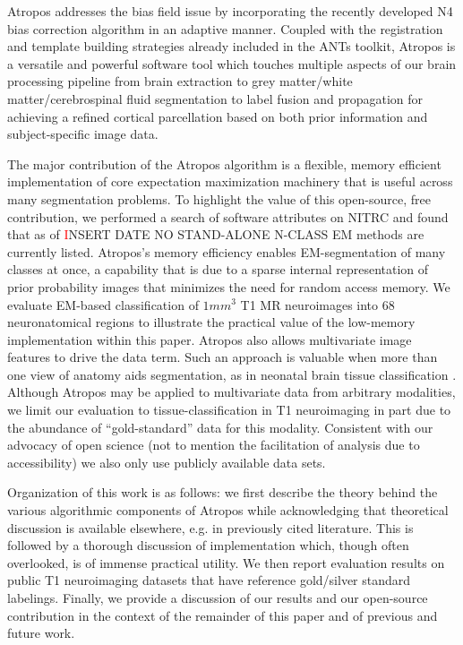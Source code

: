 \documentclass[11pt,english]{article}
\begin{document}
Atropos addresses the bias field issue by incorporating the recently developed N4 bias correction algorithm \citep{Tustison2010} in an adaptive manner.  Coupled with the registration \citep{Avants2010b} and template building strategies \citep{Avants2010} already included in the ANTs toolkit,   
Atropos is a versatile and powerful software tool which touches multiple aspects of our brain processing pipeline from brain extraction \citep{Avants2010a} to grey matter/white matter/cerebrospinal fluid segmentation to label fusion and propagation for achieving a refined cortical parcellation based on both prior information and subject-specific image data.  


The major contribution of the Atropos algorithm is a flexible, memory
efficient implementation of core expectation maximization machinery
that is useful across many segmentation problems.  To highlight the
value of this open-source, free contribution, we performed a search of
software attributes on NITRC and found that as of {\textcolor{red}
INSERT DATE NO STAND-ALONE N-CLASS EM methods are currently listed}.
Atropos's memory efficiency enables EM-segmentation of many classes at
once, a capability that is due to a sparse internal representation of
prior probability images that minimizes the need for random access
memory.  We evaluate EM-based classification of $1 mm^3$ T1 MR
neuroimages into 68 neuronatomical regions to illustrate the practical
value of the low-memory implementation within this paper.  Atropos
also allows multivariate image features to drive the data term.  Such
an approach is valuable when more than one view of anatomy aids
segmentation, as in neonatal brain tissue classification
\cite{Weisenfeld2009}.  Although Atropos may be applied to
multivariate data from arbitrary modalities, we limit our evaluation
to tissue-classification in T1 neuroimaging in part due to the
abundance of ``gold-standard'' data for this modality.  Consistent
with our advocacy of open science (not to mention the facilitation of
analysis due to accessibility) we also only use publicly available
data sets.  

Organization of this work is as follows: we first describe the theory
behind the various algorithmic components of Atropos while
acknowledging that theoretical discussion is available elsewhere,
e.g. in previously cited literature.  This is followed by a thorough
discussion of implementation which, though often overlooked, is of
immense practical utility.  We then report evaluation results on
public T1 neuroimaging datasets that have reference gold/silver
standard labelings.  Finally, we provide a discussion of our results
and our open-source contribution in the context of the remainder of
this paper and of previous and future work.
\end{document}
